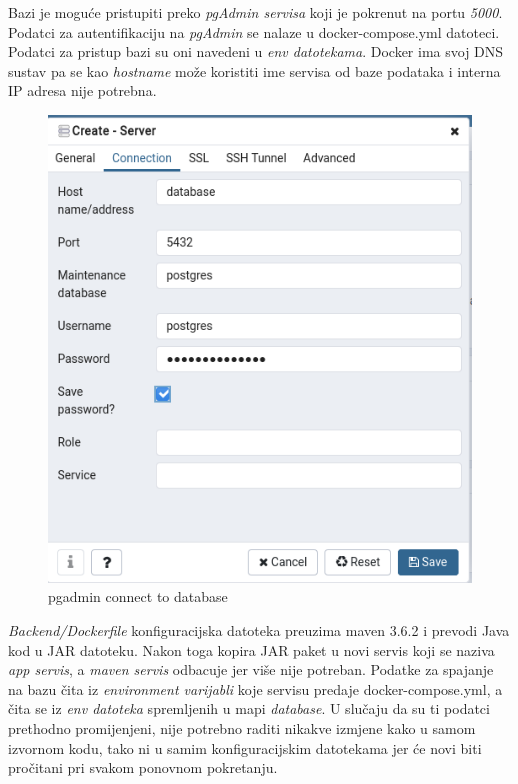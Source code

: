 			
			
				
		Bazi je moguće pristupiti preko  \textit{pgAdmin servisa} koji je pokrenut na portu  \textit{5000}. Podatci za autentifikaciju na  \textit{pgAdmin} se nalaze u docker-compose.yml datoteci. Podatci za pristup bazi su oni navedeni u  \textit{env datotekama}. Docker ima svoj DNS sustav pa se kao  \textit{hostname} može koristiti ime servisa od baze podataka i interna IP adresa nije potrebna.		
				
		\begin{figure}[H]
					\includegraphics[scale=0.6]{figures/4-pgadmin.PNG}
					\centering
					\caption{pgadmin connect to database}
					\label{fig:sekv-uc13}
				\end{figure} 
												
				
		
		 \textit{Backend/Dockerfile} konfiguracijska datoteka preuzima maven 3.6.2 i prevodi Java kod u JAR datoteku. Nakon toga kopira JAR paket u novi servis koji se naziva  \textit{app servis}, a  \textit{maven servis} odbacuje jer više nije potreban. Podatke za spajanje na bazu čita iz  \textit{environment varijabli} koje servisu predaje docker-compose.yml, a čita se iz  \textit{env datoteka} spremljenih u mapi  \textit{database}. U slučaju da su ti podatci prethodno promijenjeni, nije potrebno raditi nikakve izmjene kako u samom izvornom kodu, tako ni u  samim konfiguracijskim datotekama jer će novi biti pročitani pri svakom ponovnom pokretanju.		
		
